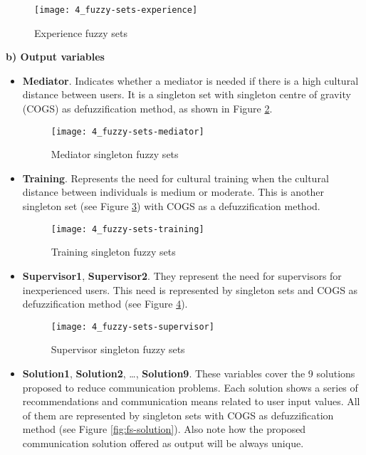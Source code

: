 	\begin{figure}
		\centering
		\texttt{[image: 4\_fuzzy-sets-experience]}
		\caption[Experience fuzzy sets]{Experience fuzzy sets}
		\label{fig:fs-exp}
	\end{figure}

\indent \textbf{b) Output variables}

\begin{itemize}
\item \textbf{Mediator}. Indicates whether a mediator is needed if there is a high cultural distance between users. It is a singleton set with singleton centre of gravity (COGS) as defuzzification method, as shown in Figure \ref{fig:fs-mediator}.

	\begin{figure}
		\centering
		\texttt{[image: 4\_fuzzy-sets-mediator]}
		\caption[Mediator singleton fuzzy sets]{Mediator singleton fuzzy sets}
		\label{fig:fs-mediator}
	\end{figure}

\item \textbf{Training}. Represents the need for cultural training when the cultural distance between individuals is medium or moderate. This is another singleton set (see Figure \ref{fig:fs-train}) with COGS as a defuzzification method.

	\begin{figure}
		\centering
		\texttt{[image: 4\_fuzzy-sets-training]}
		\caption[Training singleton fuzzy sets]{Training singleton fuzzy sets}
		\label{fig:fs-train}
	\end{figure}

\item \textbf{Supervisor1}, \textbf{Supervisor2}. They represent the need for supervisors for inexperienced users. This need is represented by singleton sets and COGS as defuzzification method (see Figure \ref{fig:fs-super}).

	\begin{figure}
		\centering
		\texttt{[image: 4\_fuzzy-sets-supervisor]}
		\caption[Supervisor singleton fuzzy sets]{Supervisor singleton fuzzy sets}
		\label{fig:fs-super}
	\end{figure}

\item \textbf{Solution1}, \textbf{Solution2}, …, \textbf{Solution9}. These variables cover the 9 solutions proposed to reduce communication problems. Each solution shows a series of recommendations and communication means related to user input values. All of them are represented by singleton sets with COGS as defuzzification method (see Figure \ref{fig:fs-solution}). Also note how the proposed communication solution offered as output will be always unique. 
\end{itemize}

